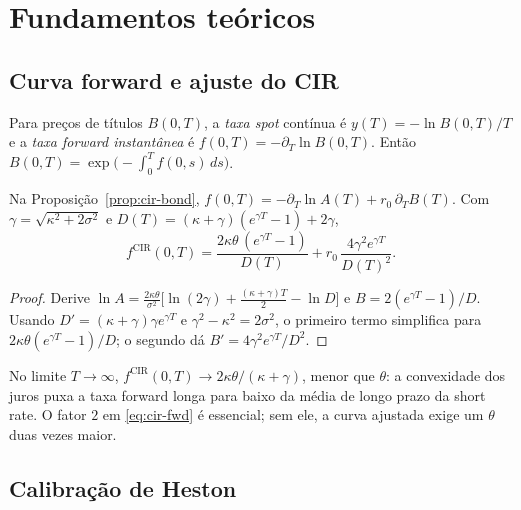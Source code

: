 \section{Fundamentos teóricos}

\subsection{Curva forward e ajuste do CIR}

\begin{definicao}
Para preços de títulos $B(0,T)$, a \emph{taxa spot} contínua é $y(T)=-\ln B(0,T)/T$ e a \emph{taxa forward instantânea} é $f(0,T)=-\partial_T\ln B(0,T)$. Então $B(0,T)=\exp\big(-\int_0^Tf(0,s)\,ds\big)$.
\end{definicao}

\begin{proposicao}\label{prop:cir-fwd}
Na Proposição~\ref{prop:cir-bond}, $f(0,T)=-\partial_T\ln A(T)+r_0\,\partial_TB(T)$. Com $\gamma=\sqrt{\kappa^2+2\sigma^2}$ e $D(T)=(\kappa+\gamma)(e^{\gamma T}-1)+2\gamma$,
\begin{equation}\label{eq:cir-fwd}
f^{\mathrm{CIR}}(0,T)=\frac{2\kappa\theta\,(e^{\gamma T}-1)}{D(T)}+r_0\,\frac{4\gamma^2e^{\gamma T}}{D(T)^2}.
\end{equation}
\end{proposicao}

\begin{proof}
Derive $\ln A=\tfrac{2\kappa\theta}{\sigma^2}\big[\ln(2\gamma)+\tfrac{(\kappa+\gamma)T}2-\ln D\big]$ e $B=2(e^{\gamma T}-1)/D$. Usando $D'=(\kappa+\gamma)\gamma e^{\gamma T}$ e $\gamma^2-\kappa^2=2\sigma^2$, o primeiro termo simplifica para $2\kappa\theta(e^{\gamma T}-1)/D$; o segundo dá $B'=4\gamma^2e^{\gamma T}/D^2$.
\end{proof}

\begin{observacao}
No limite $T\to\infty$, $f^{\mathrm{CIR}}(0,T)\to2\kappa\theta/(\kappa+\gamma)$, menor que $\theta$: a convexidade dos juros puxa a taxa forward longa para baixo da média de longo prazo da short rate. O fator $2$ em \eqref{eq:cir-fwd} é essencial; sem ele, a curva ajustada exige um $\theta$ duas vezes maior.
\end{observacao}

\subsection{Calibração de Heston}

